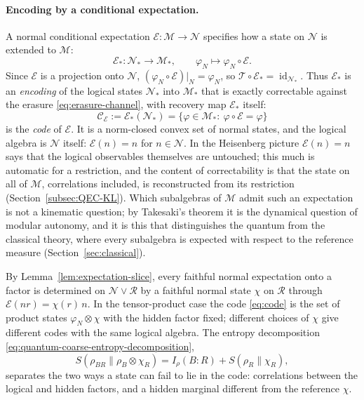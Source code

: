 \documentclass[a4paper,11pt]{article}
\theoremstyle{definition}
\newcommand{\mE}{\mathcal{E}}
\begin{document}
\paragraph{Encoding by a conditional expectation.}
A normal conditional expectation $\mE:\mathcal M\to\mathcal N$ specifies how a state on $\mathcal N$ is extended to $\mathcal M$:
\begin{equation}
 \mE_*:\mathcal N_*\to\mathcal M_*,\qquad \varphi_N\mapsto\varphi_N\circ\mE .
 \label{eq:encoding}
\end{equation}
Since $\mE$ is a projection onto $\mathcal N$, $(\varphi_N\circ\mE)|_N=\varphi_N$, so $\mathcal T\circ\mE_*=\operatorname{id}_{\mathcal N_*}$. Thus $\mE_*$ is an \emph{encoding} of the logical states $\mathcal N_*$ into $\mathcal M_*$ that is exactly correctable against the erasure \eqref{eq:erasure-channel}, with recovery map $\mE_*$ itself:
\begin{equation}
 \mathcal C_{\mE}:=\mE_*(\mathcal N_*)=\{\varphi\in\mathcal M_*:\ \varphi\circ\mE=\varphi\}
 \label{eq:code}
\end{equation}
is the \emph{code} of $\mE$. It is a norm-closed convex set of normal states, and the logical algebra is $\mathcal N$ itself: $\mE(n)=n$ for $n\in\mathcal N$. In the Heisenberg picture $\mE(n)=n$ says that the logical observables themselves are untouched; this much is automatic for a restriction, and the content of correctability is that the state on all of $\mathcal M$, correlations included, is reconstructed from its restriction (Section~\ref{subsec:QEC-KL}). Which subalgebras of $\mathcal M$ admit such an expectation is not a kinematic question; by Takesaki's theorem it is the dynamical question of modular autonomy, and it is this that distinguishes the quantum from the classical theory, where every subalgebra is expected with respect to the reference measure (Section~\ref{sec:classical}).

By Lemma~\ref{lem:expectation-slice}, every faithful normal expectation onto a factor is determined on $\mathcal N\vee\mathcal R$ by a faithful normal state $\chi$ on $\mathcal R$ through $\mE(nr)=\chi(r)\,n$. In the tensor-product case the code \eqref{eq:code} is the set of product states $\varphi_N\otimes\chi$ with the hidden factor fixed; different choices of $\chi$ give different codes with the same logical algebra. The entropy decomposition \eqref{eq:quantum-coarse-entropy-decomposition},
\[
 S(\rho_{BR}\|\rho_B\otimes\chi_R)=I_\rho(B:R)+S(\rho_R\|\chi_R),
\]
separates the two ways a state can fail to lie in the code: correlations between the logical and hidden factors, and a hidden marginal different from the reference $\chi$.
\end{document}
